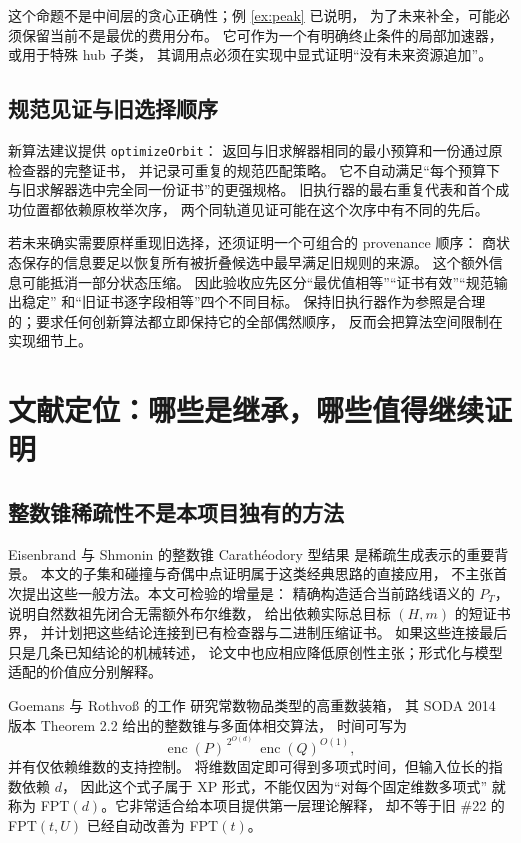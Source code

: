 \documentclass[UTF8,a4paper,11pt,fontset=fandol]{ctexart}
\theoremstyle{definition}
\newcommand{\repo}[1]{\nolinkurl{#1}}
\begin{document}
这个命题不是中间层的贪心正确性；例 \ref{ex:peak} 已说明，
为了未来补全，可能必须保留当前不是最优的费用分布。
它可作为一个有明确终止条件的局部加速器，或用于特殊 hub 子类，
其调用点必须在实现中显式证明“没有未来资源追加”。

\subsection{规范见证与旧选择顺序}

新算法建议提供 \repo{optimizeOrbit}：
返回与旧求解器相同的最小预算和一份通过原检查器的完整证书，
并记录可重复的规范匹配策略。
它不自动满足“每个预算下与旧求解器选中完全同一份证书”的更强规格。
旧执行器的最右重复代表和首个成功位置都依赖原枚举次序，
两个同轨道见证可能在这个次序中有不同的先后。

若未来确实需要原样重现旧选择，还须证明一个可组合的 provenance 顺序：
商状态保存的信息要足以恢复所有被折叠候选中最早满足旧规则的来源。
这个额外信息可能抵消一部分状态压缩。
因此验收应先区分“最优值相等”“证书有效”“规范输出稳定”
和“旧证书逐字段相等”四个不同目标。
保持旧执行器作为参照是合理的；要求任何创新算法都立即保持它的全部偶然顺序，
反而会把算法空间限制在实现细节上。

\section{文献定位：哪些是继承，哪些值得继续证明}\label{sec:literature}

\subsection{整数锥稀疏性不是本项目独有的方法}

Eisenbrand 与 Shmonin 的整数锥 Carath\'eodory 型结果
\cite{eisenbrand2006} 是稀疏生成表示的重要背景。
本文的子集和碰撞与奇偶中点证明属于这类经典思路的直接应用，
不主张首次提出这些一般方法。本文可检验的增量是：
精确构造适合当前路线语义的 $P_T$，
说明自然数祖先闭合无需额外布尔维数，
给出依赖实际总目标 $(H,m)$ 的短证书界，
并计划把这些结论连接到已有检查器与二进制压缩证书。
如果这些连接最后只是几条已知结论的机械转述，
论文中也应相应降低原创性主张；形式化与模型适配的价值应分别解释。

Goemans 与 Rothvo\ss{} 的工作
\cite{goemans2014,goemans2020} 研究常数物品类型的高重数装箱，
其 SODA 2014 版本 Theorem 2.2 给出的整数锥与多面体相交算法，
时间可写为
\[
\operatorname{enc}(P)^{\,2^{O(d)}}\,
\operatorname{enc}(Q)^{O(1)},
\]
并有仅依赖维数的支持控制。
将维数固定即可得到多项式时间，但输入位长的指数依赖 $d$，
因此这个式子属于 XP 形式，不能仅因为“对每个固定维数多项式”
就称为 FPT$(d)$。它非常适合给本项目提供第一层理论解释，
却不等于旧 \#22 的 FPT$(t,U)$ 已经自动改善为 FPT$(t)$。
\end{document}
